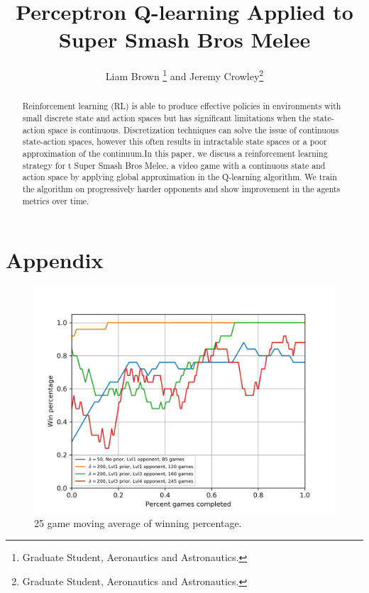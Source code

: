 \documentclass[journal]{new-aiaa}
\title{Perceptron Q-learning Applied to Super Smash Bros Melee}
\author{Liam Brown \footnote{Graduate Student, Aeronautics and Astronautics.} and Jeremy Crowley\footnote{Graduate Student, Aeronautics and Astronautics.}}
\affil{Stanford University, Stanford, CA, 94305}
\begin{document}
\maketitle

\begin{abstract}
Reinforcement learning (RL) is able to produce effective policies in environments with small discrete state and action spaces but has significant limitations when the state-action space is continuous. Discretization techniques can solve the issue of continuous state-action spaces, however this often results in intractable state spaces or a poor approximation of the continuum.In this paper, we discuss a reinforcement learning strategy for t Super Smash Bros Melee, a video game with a continuous state and action space by applying global approximation in the Q-learning algorithm. We train the algorithm on progressively harder opponents and show improvement in the agents metrics over time.

\end{abstract}


%
%



%
%



%
%



%
%



%
%



%
%



%
%
\newpage
\section*{Appendix}

\begin{figure}[!htb]
\centering
	\includegraphics[width=120mm]{winpctg.png}
	\caption{25 game moving average of winning percentage. \label{winpctg}}
\end{figure}
\end{document}
